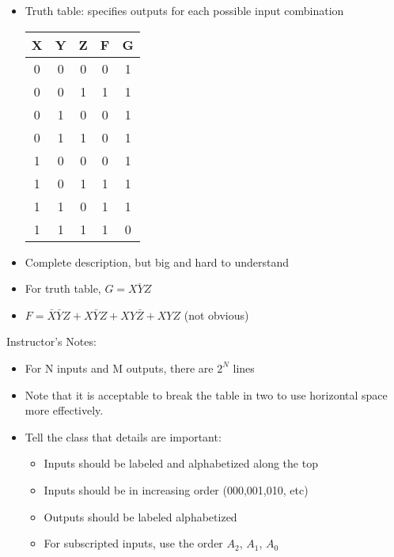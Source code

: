 \begin{frame}[fragile]
\begin{itemize}
	\item Truth table: specifies outputs for each possible input
combination 
		\begin{center}\ifnum{}\huge\fi
		\begin{tabular}{ccc|cc}
		X&Y&Z & F & G \\\hline
		0&0&0 & 0 & 1 \\
		0&0&1 & 1 & 1 \\
		0&1&0 & 0 & 1 \\
		0&1&1 & 0 & 1 \\
		1&0&0 & 0 & 1 \\
		1&0&1 & 1 & 1 \\
		1&1&0 & 1 & 1 \\
		1&1&1 & 1 & 0 \\
		\end{tabular}

		\end{center}		
	\item Complete description, but big and hard to understand
 	\item For truth table, $G = \overline{XYZ}$
	\item $F = \bar{X}\bar{Y}Z + X\bar{Y}Z + XY\bar{Z} + XYZ$ (not obvious)
\end{itemize}
\end{frame}
\BNotes\ifnum{}
\begin{frame}[fragile]
Instructor's Notes:
\begin{itemize}
\item For N inputs and M outputs, there are $2^N$ lines
\item Note that it is acceptable to break the table in two to use
horizontal space more effectively.
\item Tell the class that details are important:
\begin{itemize}
	\item Inputs should be labeled and alphabetized along the top
	\item Inputs should be in increasing order (000,001,010, etc)
	\item Outputs should be labeled alphabetized
	\item For subscripted inputs, use the order $A_2$, $A_1$, $A_0$
\end{itemize}
\end{itemize}
\end{frame}
\fi\ENotes

